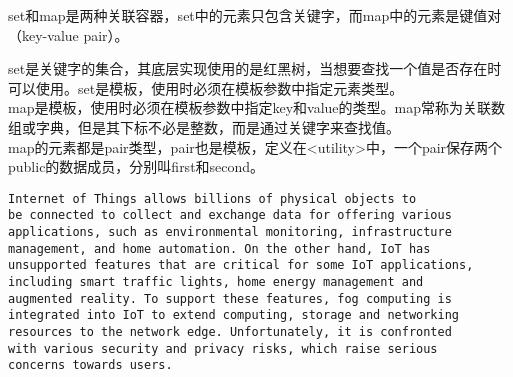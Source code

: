 set和map是两种关联容器，set中的元素只包含关键字，而map中的元素是键值对（key-value pair）。

\begin{table}[H]
	\centering
	\caption{关联容器}
\end{table}

set是关键字的集合，其底层实现使用的是红黑树，当想要查找一个值是否存在时可以使用。set是模板，使用时必须在模板参数中指定元素类型。 \\

map是模板，使用时必须在模板参数中指定key和value的类型。map常称为关联数组或字典，但是其下标不必是整数，而是通过关键字来查找值。 \\

map的元素都是pair类型，pair也是模板，定义在<utility>中，一个pair保存两个public的数据成员，分别叫first和second。 \\


\begin{lstlisting}[title=summary.txt, breaklines=true, breakatwhitespace=false]
Internet of Things allows billions of physical objects to 
be connected to collect and exchange data for offering various 
applications, such as environmental monitoring, infrastructure 
management, and home automation. On the other hand, IoT has 
unsupported features that are critical for some IoT applications, 
including smart traffic lights, home energy management and 
augmented reality. To support these features, fog computing is 
integrated into IoT to extend computing, storage and networking 
resources to the network edge. Unfortunately, it is confronted 
with various security and privacy risks, which raise serious 
concerns towards users.
\end{lstlisting}

